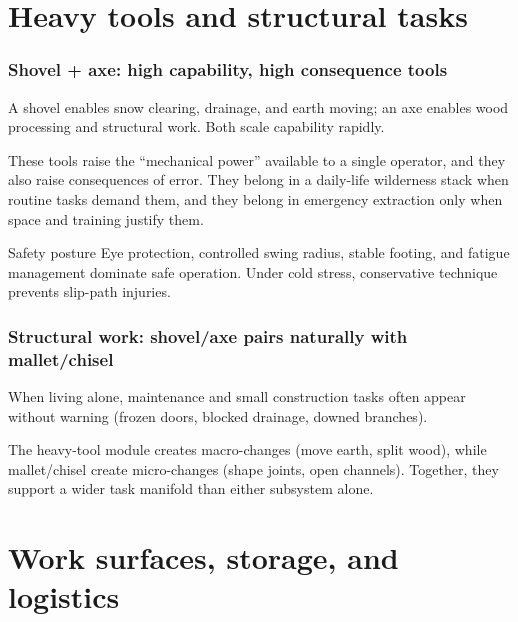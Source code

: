 \section{Heavy tools and structural tasks}

\begin{frame}[t]
  \frametitle{Shovel + axe: high capability, high consequence tools}
  \justifying
   A shovel enables snow clearing, drainage, and earth moving; an axe enables wood processing and structural work. Both scale capability rapidly.

  \vspace{0.5em}
   These tools raise the ``mechanical power'' available to a single operator, and they also raise consequences of error. They belong in a daily-life wilderness stack when routine tasks demand them, and they belong in emergency extraction only when space and training justify them.

  \vspace{0.8em}
  \begin{block}{Safety posture}
    Eye protection, controlled swing radius, stable footing, and fatigue management dominate safe operation. Under cold stress, conservative technique prevents slip-path injuries.
  \end{block}
\end{frame}

\begin{frame}[t]
  \frametitle{Structural work: shovel/axe pairs naturally with mallet/chisel}
  \justifying
   When living alone, maintenance and small construction tasks often appear without warning (frozen doors, blocked drainage, downed branches).

  \vspace{0.5em}
   The heavy-tool module creates macro-changes (move earth, split wood), while mallet/chisel create micro-changes (shape joints, open channels). Together, they support a wider task manifold than either subsystem alone.
\end{frame}

\section{Work surfaces, storage, and logistics}

